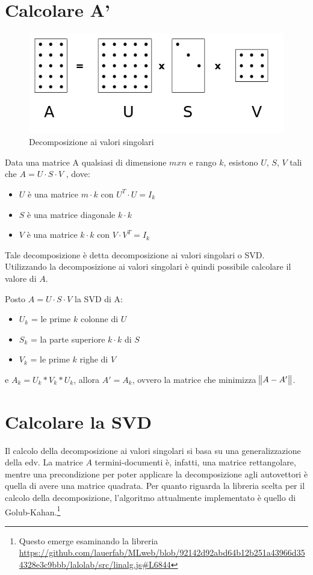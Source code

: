 \section{Calcolare A'}
\begin{figure}
  \centering
  \includegraphics[scale=0.45]{immagini/SVD.png}
  \caption{Decomposizione ai valori singolari}
  \label{fig:calcoloSVD}
\end{figure}   

\begin{theorem}
Data una matrice A qualsiasi di dimensione $m x n$ e rango $k$, esistono $U$, $S$, $V$ tali che $A = U \cdot S \cdot V$ , dove:
\begin{itemize}
    \item $U$ è una matrice $m \cdot k$ con $U^T \cdot U = I_k$
    \item $S$ è una matrice diagonale $k \cdot k$
    \item $V$ è una matrice $k \cdot k$ con $V \cdot V^T = I_k$
\end{itemize}
\end{theorem}
Tale decomposizione è detta decomposizione ai valori singolari o SVD. Utilizzando la decomposizione ai valori singolari è quindi possibile calcolare il valore di $A$.

\noindent Posto $A = U \cdot S \cdot V$ la SVD di A:
\begin{itemize}
    \item $U_k$ = le prime $k$ colonne di $U$
    \item $S_k$ = la parte superiore $k \cdot k$ di $S$
    \item $V_k$ = le prime $k$ righe di $V$
\end{itemize}

e $A_k = U_k *  V_k * U_k$, allora $A' = A_k$, ovvero la matrice che minimizza $\norm{A - A'}$.

\section{Calcolare la SVD}
Il calcolo della decomposizione ai valori singolari si basa su una generalizzazione della \gls{edv}. La matrice $A$ termini-documenti è, infatti, una matrice rettangolare, mentre una precondizione per poter applicare la decomposizione agli autovettori è quella di avere una matrice quadrata.
Per quanto riguarda la libreria scelta per il calcolo della decomposizione, l'algoritmo attualmente implementato è quello di Golub-Kahan.\footnote{Questo emerge esaminando la libreria \url{https://github.com/lauerfab/MLweb/blob/92142d92abd64b12b251a43966d354328e3c9bbb/lalolab/src/linalg.js\#L6844}}

